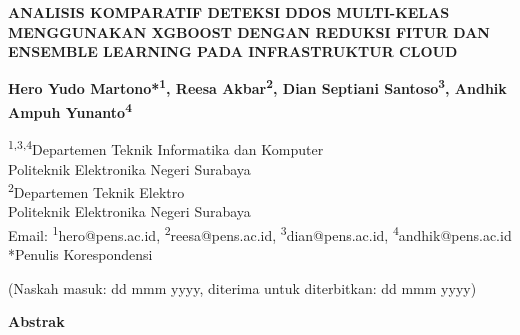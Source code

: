 \documentclass[10pt,a4paper]{article}
\begin{document}
\begin{center}
{\fontsize{12pt}{14pt}\selectfont\textbf{ANALISIS KOMPARATIF DETEKSI DDOS MULTI-KELAS MENGGUNAKAN XGBOOST DENGAN REDUKSI FITUR DAN ENSEMBLE LEARNING PADA INFRASTRUKTUR CLOUD}}

\vspace{10pt}

{\fontsize{10pt}{12pt}\selectfont\textbf{Hero Yudo Martono*\textsuperscript{1}, Reesa Akbar\textsuperscript{2}, Dian Septiani Santoso\textsuperscript{3}, Andhik Ampuh Yunanto\textsuperscript{4}}}

\vspace{10pt}

{\fontsize{10pt}{12pt}\selectfont
\textsuperscript{1,3,4}Departemen Teknik Informatika dan Komputer\\
Politeknik Elektronika Negeri Surabaya\\
\textsuperscript{2}Departemen Teknik Elektro\\
Politeknik Elektronika Negeri Surabaya\\
Email: \textsuperscript{1}hero@pens.ac.id, \textsuperscript{2}reesa@pens.ac.id, \textsuperscript{3}dian@pens.ac.id, \textsuperscript{4}andhik@pens.ac.id\\
*Penulis Korespondensi
}

\vspace{10pt}

{\fontsize{10pt}{12pt}\selectfont (Naskah masuk: dd mmm yyyy, diterima untuk diterbitkan: dd mmm yyyy)}

\vspace{10pt}

{\fontsize{10pt}{12pt}\selectfont\textbf{Abstrak}}

\vspace{10pt}


\end{center}
\end{document}
